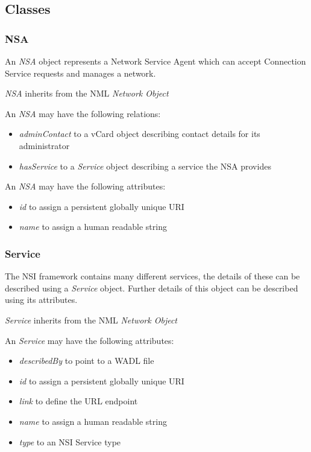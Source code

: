 \documentclass[12pt]{article}  %
\begin{document}
\subsection{Classes}%
\label{sub:classes}

\subsubsection{NSA}%
\label{class:nsa}

An \emph{NSA} object represents a Network Service Agent which can accept Connection Service requests and manages a network.

\emph{NSA} inherits from the NML \emph{Network Object}

An \emph{NSA} may have the following relations:
\begin{itemize}
  \item \emph{adminContact} to a vCard object describing contact details for its administrator
  \item \emph{hasService} to a \emph{Service} object describing a service the NSA provides
\end{itemize}

An \emph{NSA} may have the following attributes:
\begin{itemize}
  \item \emph{id} to assign a persistent globally unique URI
  \item \emph{name} to assign a human readable string  
\end{itemize}

\subsubsection{Service}%
\label{class:nsa}

The NSI framework contains many different services, the details of these can be described using a \emph{Service} object. Further details of this object can be described using its attributes.

\emph{Service} inherits from the NML \emph{Network Object}

An \emph{Service} may have the following attributes:
\begin{itemize}
  \item \emph{describedBy} to point to a WADL file
  \item \emph{id} to assign a persistent globally unique URI
  \item \emph{link} to define the URL endpoint
  \item \emph{name} to assign a human readable string  
  \item \emph{type} to an NSI Service type
\end{itemize}
\end{document}
